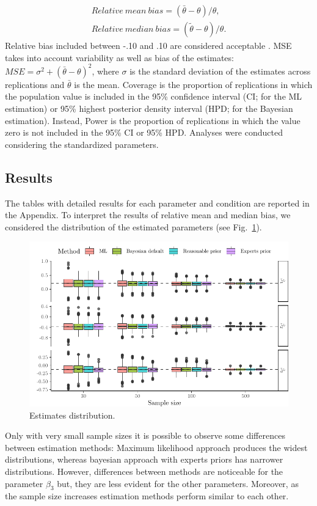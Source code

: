 \documentclass[graybox]{svmult}
\begin{document}
\begin{eqnarray}
Relative\ mean\ bias = (\bar{\theta}-\theta)/\theta,\\
Relative\ median\ bias = (\widetilde{\theta}-\theta)/\theta.
\end{eqnarray}
Relative bias included between -.10 and .10 are considered acceptable \cite{smidSemSmallSamples2020}. MSE takes into account variability as well as bias of the estimates: $MSE = \sigma^2 + (\bar{\theta}- \theta)^2$, where $\sigma$ is the standard deviation of the estimates across replications and $\bar{\theta}$ is the mean. Coverage is the proportion of replications in which the population value is included in the 95\% confidence interval (CI; for the ML estimation) or 95\% highest posterior density interval (HPD; for the Bayesian estimation). Instead, Power is the proportion of replications in which the value zero is not included in the 95\% CI or 95\% HPD. Analyses were conducted considering the standardized parameters.

\subsection{Results}

The tables with detailed results for each parameter and condition are reported in the Appendix. To interpret the results of relative mean and median bias, we considered the distribution of the estimated parameters (see Fig.~\ref{fig:boxplots}). 
\begin{figure}[b]
	\sidecaption
	\includegraphics[width = 1\textwidth]{figure/Plot_boxplots}
	\caption{Estimates distribution.}
	\label{fig:boxplots}
\end{figure}
Only with very small sample sizes it is possible to observe some differences between estimation methods: Maximum likelihood approach produces the widest distributions, whereas bayesian approach with experts priors has narrower distributions. However, differences between methods are noticeable for the parameter $\beta_3$ but, they are less evident for the other parameters. Moreover, as the sample size increases estimation methods perform similar to each other.
\end{document}

